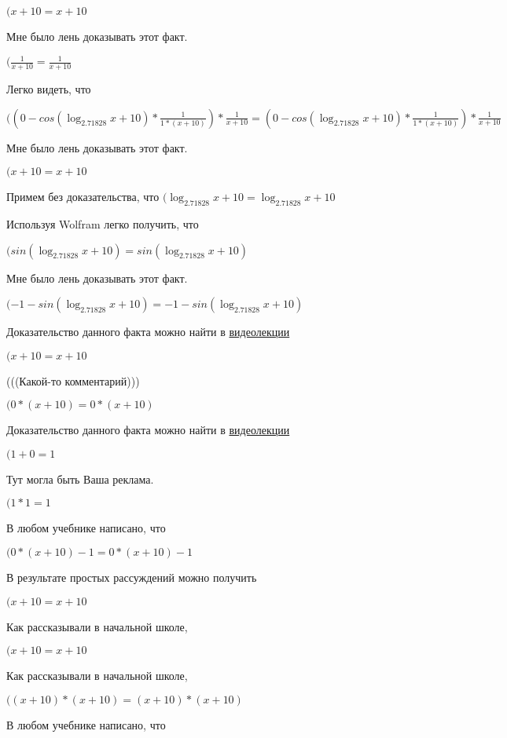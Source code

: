 \documentclass[12pt,a4paper,fleqn]{article}
\theoremstyle{definition}
\begin{document}
$( x  +  10  =  x  +  10 $

Мне было лень доказывать этот факт.

$(\frac{ 1 }{ x  +  10 }
 = \frac{ 1 }{ x  +  10 }
$

Легко видеть, что

$(( 0  - cos(\log_{ 2.71828 }{ x  +  10 }) * \frac{ 1 }{ 1  * ( x  +  10 )}
) * \frac{ 1 }{ x  +  10 }
 = ( 0  - cos(\log_{ 2.71828 }{ x  +  10 }) * \frac{ 1 }{ 1  * ( x  +  10 )}
) * \frac{ 1 }{ x  +  10 }
$

Мне было лень доказывать этот факт.

$( x  +  10  =  x  +  10 $

Примем без доказательства, что
$(\log_{ 2.71828 }{ x  +  10 } = \log_{ 2.71828 }{ x  +  10 }$

Используя Wolfram легко получить, что

$(sin(\log_{ 2.71828 }{ x  +  10 }) = sin(\log_{ 2.71828 }{ x  +  10 })$

Мне было лень доказывать этот факт.

$( -1  - sin(\log_{ 2.71828 }{ x  +  10 }) =  -1  - sin(\log_{ 2.71828 }{ x  +  10 })$

Доказательство данного факта можно найти в \href{https://www.youtube.com/watch?v=dQw4w9WgXcQ}{видеолекции}

$( x  +  10  =  x  +  10 $

(((Какой-то комментарий)))

$( 0  * ( x  +  10 ) =  0  * ( x  +  10 )$

Доказательство данного факта можно найти в \href{https://www.youtube.com/watch?v=dQw4w9WgXcQ}{видеолекции}

$( 1  +  0  =  1 $

Тут могла быть Ваша реклама.

$( 1  *  1  =  1 $

В любом учебнике написано, что

$( 0  * ( x  +  10 ) -  1  =  0  * ( x  +  10 ) -  1 $

В результате простых рассуждений можно получить

$( x  +  10  =  x  +  10 $

Как рассказывали в начальной школе,

$( x  +  10  =  x  +  10 $

Как рассказывали в начальной школе,

$(( x  +  10 ) * ( x  +  10 ) = ( x  +  10 ) * ( x  +  10 )$

В любом учебнике написано, что
\end{document}
